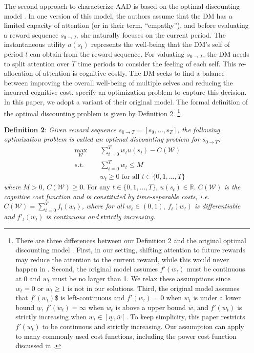 \documentclass[
  12pt,
]{article}
\begin{document}
The second approach to characterize AAD is based on the optimal
discounting model \citep{noor2022optimal,noor2024constrained}. In one
version of this model, the authors assume that the DM has a limited
capacity of attention (or in their term, ``empathy''), and before
evaluating a reward sequence \(s_{0\rightarrow T}\), she naturally
focuses on the current period. The instantaneous utility \(u(s_t)\)
represents the well-being that the DM's self of period \(t\) can obtain
from the reward sequence. For valuating \(s_{0\rightarrow T}\), the DM
needs to split attention over \(T\) time periods to consider the feeling
of each self. This re-allocation of attention is cognitive costly. The
DM seeks to find a balance between improving the overall well-being of
multiple selves and reducing the incurred cognitive cost.
\citet{noor2022optimal,noor2024constrained} specify an optimization
problem to capture this decision. In this paper, we adopt a variant of
their original model. The formal definition of the optimal discounting
problem is given by Definition 2. \footnote{There are three differences
  between our Definition 2 and the original optimal discounting model
  \citep{noor2022optimal,noor2024constrained}. First, in our setting,
  shifting attention to future rewards may reduce the attention to the
  current reward, while this would never happen in
  \citet{noor2022optimal,noor2024constrained}. Second, the original
  model assumes \(f'(w_t)\) must be continuous at 0 and \(w_t\) must be
  no larger than 1. We relax these assumptions since \(w_t=0\) or
  \(w_t\geq1\) is not in our solutions. Third, the original model
  assumes that \(f'(w_t)\)\$ is left-continuous and \(f'(w_t)=0\) when
  \(w_t\) is under a lower bound \(\underline{w}\), \(f'(w_t)=\infty\)
  when \(w_t\) is above a upper bound \(\bar{w}\), and \(f'(w_t)\) is
  strictly increasing when \(w_t \in [\underline{w},\bar{w}]\). To keep
  simplicity, this paper restricts \(f'(w_t)\) to be continuous and
  strictly increasing. Our assumption can apply to many commonly used
  cost functions, including the power cost function discussed in
  \citet{noor2022optimal,noor2024constrained}.}

\noindent \textbf{Definition 2}: \emph{Given reward sequence}
\(s_{0\rightarrow T}=[s_0,...,s_T]\)\emph{, the following optimization
problem is called an optimal discounting problem for}
\(s_{0\rightarrow T}\)\emph{:}\[
\begin{aligned}
&\max_{\mathcal{W}}\;&&\sum_{t=0}^T w_tu(s_t) - C(\mathcal{W}) \\
&s.t.\; &&\sum_{t=0}^Tw_t \leq M \\
&&& w_t \geq 0 \text{ for all } t\in \{0,1,...,T\}
\end{aligned}
\]\emph{where} \(M>0\)\emph{,} \(C(\mathcal{W})\geq 0\). For any
\(t\in\{0,1,…,T\}\), \(u(s_t)\in\mathbb{R}\). \(C(\mathcal{W})\)
\emph{is the cognitive cost function and is constituted by
time-separable costs, i.e.}
\(C(\mathcal{W})=\sum_{t=0}^Tf_t(w_t)\)\emph{, where for all}
\(w_t\in(0,1)\)\emph{,} \(f_t(w_t)\) \emph{is differentiable and}
\(f'_t(w_t)\) \emph{is continuous and} stric\emph{tly increasing.}
\end{document}
